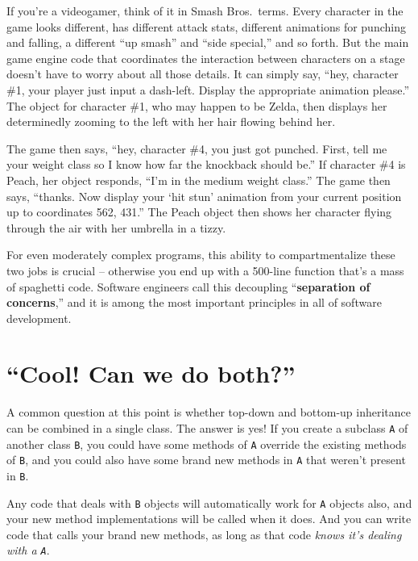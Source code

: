 If you're a videogamer, think of it in Smash Bros.~terms. Every character in
the game looks different, has different attack stats, different animations for
punching and falling, a different ``up smash'' and ``side special,'' and so
forth. But the main game engine code that coordinates the interaction between
characters on a stage doesn't have to worry about all those details. It can
simply say, ``hey, character \#1, your player just input a dash-left. Display
the appropriate animation please.'' The object for character \#1, who may
happen to be Zelda, then displays her determinedly zooming to the left with
her hair flowing behind her.

The game then says, ``hey, character \#4, you just got punched. First, tell me
your weight class so I know how far the knockback should be.'' If character \#4
is Peach, her object responds, ``I'm in the medium weight class.'' The game
then says, ``thanks. Now display your `hit stun' animation from your current
position up to coordinates 562, 431.'' The Peach object then shows her
character flying through the air with her umbrella in a tizzy.

For even moderately complex programs, this ability to compartmentalize these
two jobs is crucial -- otherwise you end up with a 500-line function that's a
mass of spaghetti code. Software engineers call this decoupling
``\textbf{separation of concerns},'' and it is among the most important
principles in all of software development.
\vspace{1in}
\pagebreak

\section{``Cool! Can we do both?''}

A common question at this point is whether top-down and bottom-up inheritance
can be combined in a single class. The answer is yes! If you create a
subclass \texttt{A} of another class \texttt{B}, you could have some methods
of \texttt{A} override the existing methods of \texttt{B}, and you could also
have some brand new methods in \texttt{A} that weren't present in \texttt{B}.

Any code that deals with \texttt{B} objects will automatically work for
\texttt{A} objects also, and your new method implementations will be called
when it does. And you can write code that calls your brand new methods, as
long as that code \textit{knows it's dealing with a \texttt{A}}.

